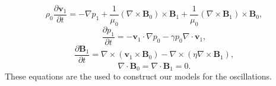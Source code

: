 \documentclass[12pt,a4paper,twoside]{article}
\begin{document}
\begin{equation}
\rho_0 \frac{\partial \boldsymbol{v}_1}{\partial t}  = - \nabla p_1 + \frac{1}{\mu_0} (\nabla \times \boldsymbol{B}_0) \times \boldsymbol{B}_1 + \frac{1}{\mu_0} (\nabla \times \boldsymbol{B}_1) \times \boldsymbol{B}_0 ,
\end{equation}
\begin{equation}
\frac{\partial p_1}{\partial t} = - \boldsymbol{v}_1 \cdot \nabla p_0 - \gamma p_0 \nabla \cdot \boldsymbol{v}_1 , 
\end{equation}
\begin{equation}
\frac{\partial \boldsymbol{B}_1}{\partial t} = \nabla \times (\boldsymbol{v}_1 \times \boldsymbol{B}_0) - \nabla \times (\eta \nabla \times \boldsymbol{B}_1) ,
\end{equation}
\begin{equation}
\nabla \cdot \boldsymbol{B}_0 = \nabla \cdot \boldsymbol{B}_1 = 0 .
\end{equation}
These equations are the used to construct our models for the oscillations. 
\end{document}
